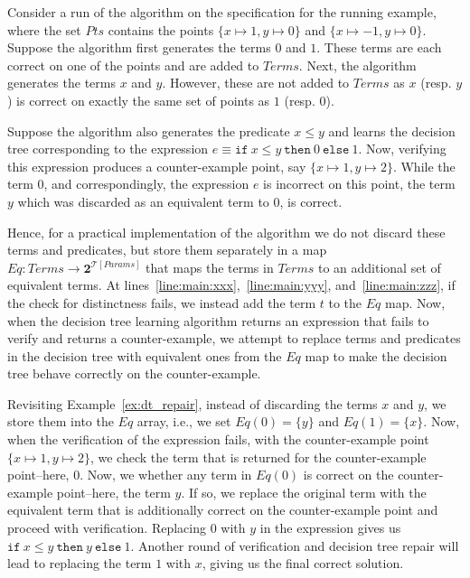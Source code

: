 \documentclass{llncs}
\newcommand\Equiv{\mathit{Eq}}
\newcommand\Points{\mathit{Pts}}
\newcommand\Expr{e}
\newcommand\Terms{\mathit{Terms}}
\newcommand\Term{t}
\newcommand\Powerset[1]{\mathbf{2}^{#1}}
\newcommand\FormalParameters{\mathit{Params}}
\newcommand\Theory{\mathcal{T}}
\begin{document}
\begin{example}
  Consider a run of the algorithm on the specification for the running
  example, where the set $\Points$ contains the points $\{ x \mapsto 1,
  y \mapsto 0 \}$ and $\{ x \mapsto -1, y \mapsto 0 \}$.
  Suppose the algorithm first generates the terms $0$ and $1$.
  These terms are each correct on one of the points and are added to
  $\Terms$.
  Next, the algorithm generates the terms $x$ and $y$.
  However, these are not added to $\Terms$ as $x$ (resp. $y$) is correct
  on exactly the same set of points as $1$ (resp. $0$).

  Suppose the algorithm also generates the predicate $x \leq y$ and
  learns the decision tree corresponding to the expression $\Expr \equiv
  \mathtt{if}~x \leq y~\mathtt{then}~0~\mathtt{else}~1$.
  Now, verifying this expression produces a counter-example point, say
  $\{ x \mapsto 1, y \mapsto 2 \}$.
  While the term $0$, and correspondingly, the expression $\Expr$ is
  incorrect on this point, the term $y$ which was discarded as an
  equivalent term to $0$, is correct.
\end{example}

Hence, for a practical implementation of the algorithm we do not discard
these terms and predicates, but store them separately in a map $\Equiv :
\Terms \to \Powerset{\Theory[\FormalParameters]}$ that maps the terms in
$\Terms$ to an additional set of equivalent terms.
At lines~\ref{line:main:xxx},~\ref{line:main:yyy},
and~\ref{line:main:zzz}, if the check for distinctness fails, we
instead add the term $\Term$ to the $\Equiv$ map.
Now, when the decision tree learning algorithm returns an expression
that fails to verify and returns a counter-example, we attempt to
replace terms and predicates in the decision tree with equivalent ones
from the $\Equiv$ map to make the decision tree behave correctly on the
counter-example.

\begin{example}
  Revisiting Example~\ref{ex:dt_repair}, instead of discarding the terms
  $x$ and $y$, we store them into the $\Equiv$ array, i.e., we set
  $\Equiv(0) = \{ y \}$ and $\Equiv(1) = \{ x \}$.
  Now, when the verification of the expression fails, with the
  counter-example point $\{ x \mapsto 1, y \mapsto 2 \}$, we check the
  term that is returned for the counter-example point--here, $0$.
  Now, we whether any term in $\Equiv(0)$ is correct on the
  counter-example point--here, the term $y$.
  If so, we replace the original term with the equivalent term that is
  additionally correct on the counter-example point and proceed with
  verification.
  Replacing $0$ with $y$ in the expression gives us $\mathtt{if}~x \leq
  y~\mathtt{then}~y~\mathtt{else}~1$.
  Another round of verification and decision tree repair will lead to
  replacing the term $1$ with $x$, giving us the final correct solution.
\end{example}
\end{document}
